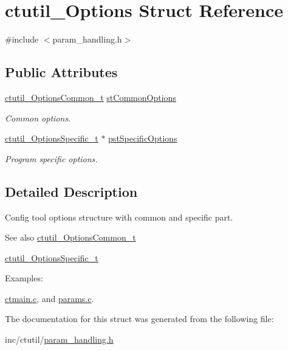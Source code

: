 \hypertarget{structctutil__Options}{}\section{ctutil\+\_\+\+Options Struct Reference}
\label{structctutil__Options}


{\ttfamily \#include $<$param\+\_\+handling.\+h$>$}

\subsection*{Public Attributes}
\begin{DoxyCompactItemize}
\item 
\hypertarget{structctutil__Options_a256e1430e0df48d0a10d801bd636387c}{}\label{structctutil__Options_a256e1430e0df48d0a10d801bd636387c} 
\hyperlink{param__handling_8h_a7bb6d4cb6913a808aafc5d9c2fc0aa36}{ctutil\+\_\+\+Options\+Common\+\_\+t} \hyperlink{structctutil__Options_a256e1430e0df48d0a10d801bd636387c}{st\+Common\+Options}
\begin{DoxyCompactList}\small\item\em Common options. \end{DoxyCompactList}\item 
\hypertarget{structctutil__Options_aa4e145d1751d27276f75707d5e35248e}{}\label{structctutil__Options_aa4e145d1751d27276f75707d5e35248e} 
\hyperlink{param__handling_8h_a658c8227d546be5c7f560dc8edf07915}{ctutil\+\_\+\+Options\+Specific\+\_\+t} $\ast$ \hyperlink{structctutil__Options_aa4e145d1751d27276f75707d5e35248e}{pst\+Specific\+Options}
\begin{DoxyCompactList}\small\item\em Program specific options. \end{DoxyCompactList}\end{DoxyCompactItemize}


\subsection{Detailed Description}
Config tool options structure with common and specific part. \begin{DoxySeeAlso}{See also}
\hyperlink{param__handling_8h_a7bb6d4cb6913a808aafc5d9c2fc0aa36}{ctutil\+\_\+\+Options\+Common\+\_\+t} 

\hyperlink{param__handling_8h_a658c8227d546be5c7f560dc8edf07915}{ctutil\+\_\+\+Options\+Specific\+\_\+t} 
\end{DoxySeeAlso}
\begin{Desc}
\item[Examples\+: ]\par
\hyperlink{ctmain_8c-example}{ctmain.\+c}, and \hyperlink{params_8c-example}{params.\+c}.\end{Desc}


The documentation for this struct was generated from the following file\+:\begin{DoxyCompactItemize}
\item 
inc/ctutil/\hyperlink{param__handling_8h}{param\+\_\+handling.\+h}\end{DoxyCompactItemize}
